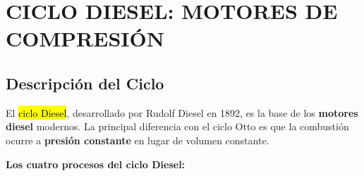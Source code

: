 \documentclass{article}
\begin{document}
\vspace{5mm}

\section*{CICLO DIESEL: MOTORES DE COMPRESIÓN}

\subsection*{Descripción del Ciclo}

El \hl{ciclo Diesel}, desarrollado por Rudolf Diesel en 1892, es la base de los \textbf{motores diesel} modernos. La principal diferencia con el ciclo Otto es que la combustión ocurre a \textbf{presión constante} en lugar de volumen constante.

\textbf{Los cuatro procesos del ciclo Diesel:}
\end{document}

